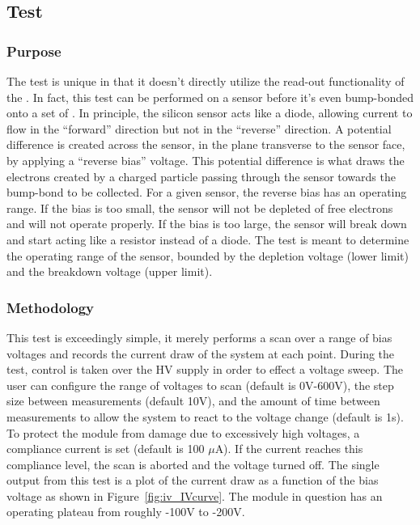 
\newpage

\subsection{\iv Test}
\label{ss:iv}

\subsubsection{Purpose}

The \iv test is unique in that it doesn't directly utilize the read-out functionality of the \roc.
In fact, this test can be performed on a sensor before it's even bump-bonded onto a set of \rocs.
In principle, the silicon sensor acts like a diode, 
allowing current to flow in the ``forward'' direction but not in the ``reverse'' direction.
A potential difference is created across the sensor, in the plane transverse to the sensor face,
by applying a ``reverse bias'' voltage.
This potential difference is what draws the electrons created by a charged particle passing through the sensor 
towards the bump-bond to be collected.
For a given sensor, the reverse bias has an operating range.
If the bias is too small, the sensor will not be depleted of free electrons and will not operate properly.
If the bias is too large, the sensor will break down and start acting like a resistor instead of a diode.
The \iv test is meant to determine the operating range of the sensor, 
bounded by the depletion voltage (lower limit) and the breakdown voltage (upper limit).

\subsubsection{Methodology}

This test is exceedingly simple, it merely performs a scan over a range of bias voltages
and records the current draw of the system at each point.
During the test, control is taken over the HV supply in order to effect a voltage sweep.
The user can configure the range of voltages to scan (default is 0V-600V),
the step size between measurements (default 10V), 
and the amount of time between measurements to allow the system to react to the voltage change (default is 1s).
To protect the module from damage due to excessively high voltages, a compliance current is set (default is 100 $\mu$A).
If the current reaches this compliance level, the scan is aborted and the voltage turned off.
The single output from this test is a plot of the current draw as a function of the bias voltage
as shown in Figure~\ref{fig:iv_IVcurve}.
The module in question has an operating plateau from roughly -100V to -200V.

